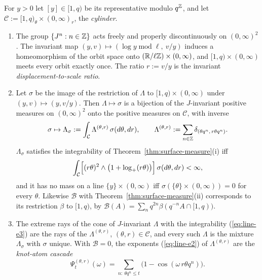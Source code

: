 \begin{theorem}
\label{thm:knot-atom-cascades}

For $y > 0$ let $[y] \in [1,q)$ be its representative modulo $q^{\mathbb{Z}}$, and let
$\mathcal{C} := [1,q)_\theta \times (0,\infty)_r$, the \emph{cylinder}.
\begin{enumerate}
\item The group $\{J^n : n \in \mathbb{Z}\}$ acts freely and properly discontinuously on $(0,\infty)^2$.
The invariant map $(y,v) \mapsto (\log y \operatorname{mod} \ell,\ v/y)$ induces a homeomorphism of the orbit
space onto $(\mathbb{R}/\ell\mathbb{Z}) \times (0,\infty)$, and $[1,q) \times (0,\infty)$ meets every orbit
exactly once. The ratio $r := v/y$ is the invariant \emph{displacement-to-scale ratio}.
\item Let $\sigma$ be the image of the restriction of $\Lambda$ to $[1,q) \times (0,\infty)$ under
$(y,v) \mapsto (y, v/y)$. Then $\Lambda \mapsto \sigma$ is a bijection of the $J$-invariant positive
measures on $(0,\infty)^2$ onto the positive measures on $\mathcal{C}$, with inverse
\[
  \sigma \mapsto \Lambda_\sigma := \int_{\mathcal{C}}\Lambda^{(\theta,r)}\,\sigma(d\theta,dr),
  \qquad \Lambda^{(\theta,r)} := \sum_{n \in \mathbb{Z}}\delta_{(\theta q^n,\, r\theta q^n)} .
\]
$\Lambda_\sigma$ satisfies the integrability of Theorem~\ref{thm:surface-measure}(i) iff
\begin{equation}\label{eq:line-e3}
  \int_{\mathcal{C}}\Bigl[(r\theta)^2 \wedge \bigl(1 + \log_+(r\theta)\bigr)\Bigr]\,
  \sigma(d\theta,dr) < \infty ,
\end{equation}
and it has no mass on a line $\{y\} \times (0,\infty)$ iff
$\sigma(\{\theta\} \times (0,\infty)) = 0$ for every $\theta$. Likewise $\mathcal{B}$ with
Theorem~\ref{thm:surface-measure}(ii) corresponds to its restriction $\beta$ to $[1,q)$, by
$\mathcal{B}(A) = \sum_nq^{2n}\beta(q^{-n}A \cap [1,q))$.
\item The extreme rays of the cone of $J$-invariant $\Lambda$ with the integrability (\ref{eq:line-e3}) are the
rays of the $\Lambda^{(\theta,r)}$, $(\theta,r) \in \mathcal{C}$, and every such $\Lambda$ is the
mixture $\Lambda_\sigma$ with $\sigma$ unique. With $\mathcal{B} = 0$, the exponents (\ref{eq:line-e2}) of
$\Lambda^{(\theta,r)}$ are the \emph{knot-atom cascade}
\begin{equation}\label{eq:line-e4}
  \Psi^{(\theta,r)}_t(\omega) = \sum_{n :\ \theta q^n \le t}\bigl(1 - \cos(\omega\,r\theta q^n)\bigr).
\end{equation}

\end{enumerate}
\end{theorem}
